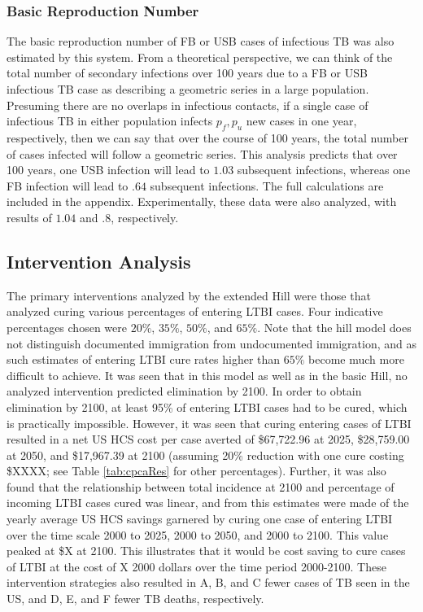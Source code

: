 \documentclass{amsart}
\begin{document}
\subsubsection{Basic Reproduction Number}
The basic reproduction number of FB or USB cases of infectious TB was also
estimated by this system. From a theoretical perspective, we can think of the
total number of secondary infections over 100 years due to a FB or USB
infectious TB case as describing a geometric series in a large population.
Presuming there are no overlaps in infectious contacts, if a single case of
infectious TB in either population infects $p_f, p_u$ new cases in one year,
respectively, then we can say that over the course of 100 years, the total
number of cases infected will follow a geometric series. This analysis predicts
that over 100 years, one USB infection will lead to $1.03$ subsequent infections,
whereas one FB infection will lead to $.64$ subsequent infections. The full calculations
are included in the appendix.  Experimentally, these data were also analyzed, 
with results of $1.04$ and $.8$, respectively. 

\subsection{Intervention Analysis}
The primary interventions analyzed by the extended Hill were those that analyzed
curing various percentages of entering LTBI cases. Four indicative percentages
chosen were $20\%$, $35\%$, $50\%$, and $65\%$. Note that the hill model does
not distinguish documented immigration from undocumented immigration, and as
such estimates of entering LTBI cure rates higher than $65\%$ become much more
difficult to achieve. It was seen that in this model as well as in the basic
Hill, no analyzed intervention predicted elimination by 2100. In order to obtain
elimination by 2100, at least 95\% of entering LTBI cases had to be cured, which
is practically impossible. However, it was seen that curing entering cases of
LTBI resulted in a net US HCS cost per case averted of \$67,722.96 at 2025, \$28,759.00 at 2050,
and \$17,967.39 at 2100 (assuming 20\% reduction with one cure costing \$XXXX; see Table
\ref{tab:cpcaRes} for other percentages). Further, it was also found that the relationship
between total incidence at 2100 and percentage of incoming LTBI cases cured was linear, and
from this estimates were made of the yearly average US HCS savings garnered by
curing one case of entering LTBI over the time scale 2000 to 2025, 2000 to 2050,
and 2000 to 2100. This value peaked at \$X at 2100. This illustrates that it
would be cost saving to cure cases of LTBI at the cost of X 2000 dollars over
the time period 2000-2100. These intervention strategies also resulted in A, B,
and C fewer cases of TB seen in the US, and D, E, and F fewer TB
deaths, respectively. 
\end{document}

